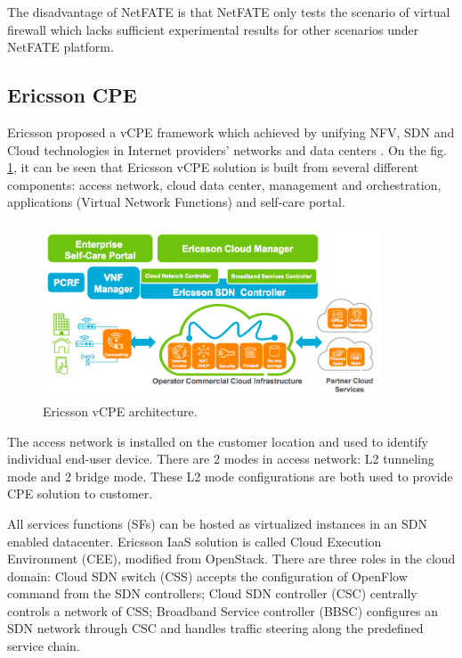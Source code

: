 The disadvantage of NetFATE is that NetFATE only tests the scenario of virtual firewall which lacks sufficient experimental results for other scenarios under NetFATE platform.




\subsection{Ericsson CPE}
Ericsson proposed a vCPE framework which achieved by unifying NFV, SDN and Cloud technologies in Internet providers’ networks and data centers \cite{ericsson-vcpe}.
On the fig. \ref{fig:ericsson_archi}, it can be seen that Ericsson vCPE solution is built from several different components: access network, cloud data center, management and orchestration, applications (Virtual Network Functions) and self-care portal.

\begin{figure}[!ht]
\centering
\includegraphics[width=0.9\textwidth]{./fig/ericsson_archi.png}
\caption{Ericsson vCPE architecture.\cite{ericsson-vcpe}}
\label{fig:ericsson_archi}
\end{figure}

The access network is installed on the customer location and used to identify individual end-user device.
There are 2 modes in access network: L2 tunneling mode and 2 bridge mode.
These L2 mode configurations are both used to provide CPE solution to customer.

All services functions (SFs) can be hosted as virtualized instances in an SDN enabled datacenter.
Ericsson IaaS solution is called Cloud Execution Environment (CEE), modified from OpenStack.
There are three roles in the cloud domain:
Cloud SDN switch (CSS) accepts the configuration of OpenFlow command from the SDN controllers;
Cloud SDN controller (CSC) centrally controls a network of CSS;
Broadband Service controller (BBSC) configures an SDN network through CSC and handles traffic steering along the predefined service chain.

